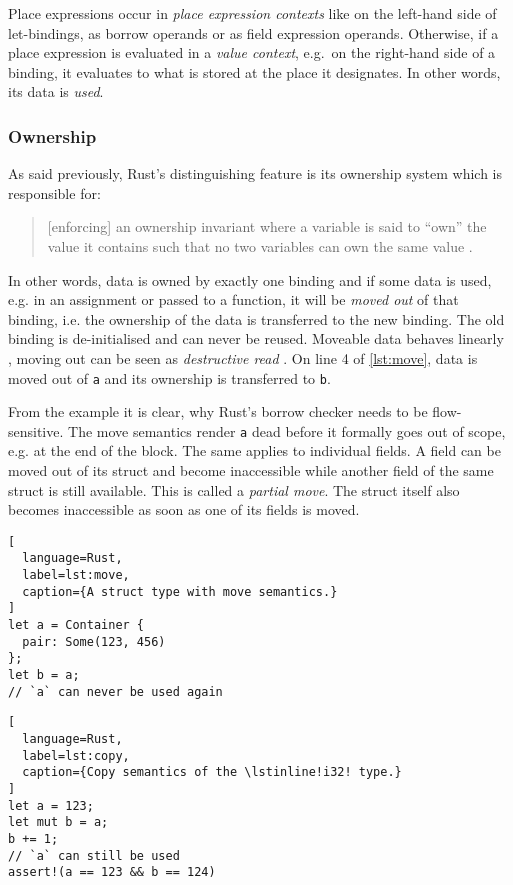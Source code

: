 Place expressions occur in \emph{place expression contexts} like on the
left-hand side of let-bindings, as borrow operands or as field expression
operands. Otherwise, if a place expression is evaluated in a \emph{value
context}, e.g.~on the right-hand side of a binding, it evaluates to what is
stored at the place it designates. In other words, its data is \emph{used}.

\subsubsection{Ownership}

As said previously, Rust's distinguishing feature is its ownership system which
is responsible for:

\begin{quote}
{[enforcing]} an ownership invariant where a
variable is said to ``own'' the value it contains such that no two variables can
own the same value \cite[page 5]{lightweight-formalism}.
\end{quote}

In other words, data is owned by exactly one binding and if some data is used,
e.g. in an assignment or passed to a function, it will be \emph{moved out} of
that binding, i.e. the ownership of the data is transferred to the new binding.
The old binding is de-initialised and can never be reused. Moveable data behaves
linearly \cite{oxide}, moving out can be seen as \emph{destructive read}
\cite{islands-alias-protection}. On line 4 of \autoref{lst:move}, data is moved
out of \lstinline!a! and its ownership is transferred to \lstinline!b!.

From the example it is clear, why Rust's borrow checker needs to be
flow-sensitive. The move semantics render \lstinline!a! dead before it formally
goes out of scope, e.g. at the end of the block. The same applies to individual
fields. A field can be moved out of its struct and become inaccessible while
another field of the same struct is still available. This is called a
\emph{partial move}. The struct itself also becomes inaccessible as soon as one
of its fields is moved.

\noindent\begin{minipage}[t]{.48\textwidth}
\begin{lstlisting}[
  language=Rust,
  label=lst:move,
  caption={A struct type with move semantics.}
]
let a = Container {
  pair: Some(123, 456)
};
let b = a;
// `a` can never be used again
\end{lstlisting}
\end{minipage}\hfill
\begin{minipage}[t]{.48\textwidth}
\begin{lstlisting}[
  language=Rust,
  label=lst:copy,
  caption={Copy semantics of the \lstinline!i32! type.}
]
let a = 123;
let mut b = a;
b += 1;
// `a` can still be used
assert!(a == 123 && b == 124)
\end{lstlisting}
\end{minipage}

